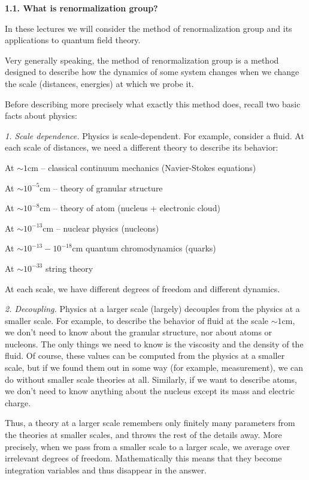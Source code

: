 {\bf 1.1. What is renormalization group?}

In these lectures we will consider the method of renormalization 
group and its applications to quantum field theory. 

Very generally speaking, the method of renormalization group is 
a method designed to describe how the dynamics of some system changes
when we change the scale (distances, energies) at which we probe it. 

Before describing more precisely what exactly this method does, recall 
two basic facts about physics:

{\it 1. Scale dependence.} Physics is scale-dependent.
For example, consider a fluid. At each scale of
distances, we need a different theory to describe its behavior:

At $\sim 1$cm -- classical continuum mechanics (Navier-Stokes equations)

At $\sim 10^{-5}$cm -- theory of granular structure

At $\sim 10^{-8}$cm -- theory of atom (nucleus + electronic cloud)

At $\sim 10^{-13}$cm -- nuclear physics (nucleons)

At $\sim 10^{-13}-10^{-18}$cm quantum chromodynamics (quarks)

At $\sim 10^{-33}$ string theory

At each scale, we have different degrees of freedom and different 
dynamics.

{\it 2. Decoupling.} Physics at a larger scale (largely) decouples
from the physics at a smaller scale. 
For example, to describe the behavior of fluid at the scale $\sim 1$cm,
we don't need to know about the granular structure, nor about atoms 
or nucleons. The only things we need to know is the viscosity 
and the density of the fluid. Of course, these values can be computed 
from the physics at a smaller scale, but if we found them out in some 
way (for example, measurement), we can do without smaller scale theories at
all. Similarly, if we want to describe atoms, we don't need to know
anything about the nucleus except its mass and electric charge. 

Thus, a theory at a larger scale remembers only finitely many parameters
from the theories at smaller scales, and throws the rest 
of the details away. More precisely, when we pass from a smaller scale
to a larger scale, we average over irrelevant degrees of freedom.
Mathematically this means that they become integration variables and
thus disappear in the answer. 

